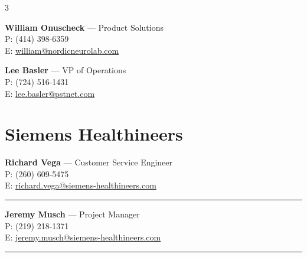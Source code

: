 \documentclass[10pt,a4paper,landscape]{article}
\begin{document}
\begin{multicols}{3}
\begin{tcolorbox}[title={\small\bfseries\color{ndblue} NORDIC NEUROLAB}, colbacktitle=cardbg, coltitle=ndblue, detach title, before upper={\tcbtitle\vspace{4pt}\hrule\vspace{6pt}}]
    \textbf{William Onuscheck} \small{--- Product Solutions} \\
    \small{P: (414) 398-6359} \\
    \small{E: \href{mailto:william@nordicneurolab.com}{william@nordicneurolab.com}}
\end{tcolorbox}

\begin{tcolorbox}[title={\small\bfseries\color{ndblue} ENCORE MRI SIMULATOR}, colbacktitle=cardbg, coltitle=ndblue, detach title, before upper={\tcbtitle\vspace{4pt}\hrule\vspace{6pt}}]
    \textbf{Lee Basler} \small{--- VP of Operations} \\
    \small{P: (724) 516-1431} \\
    \small{E: \href{mailto:lee.basler@pstnet.com}{lee.basler@pstnet.com}}
\end{tcolorbox}



\section*{Siemens Healthineers}

\begin{tcolorbox}
    \textbf{Richard Vega} \small{--- Customer Service Engineer} \\
    \small{P: (260) 609-5475} \\
    \small{E: \href{mailto:richard.vega@siemens-healthineers.com}{richard.vega@siemens-healthineers.com}}

    \vspace{4pt}\hrule\vspace{4pt}

    \textbf{Jeremy Musch} \small{--- Project Manager} \\
    \small{P: (219) 218-1371} \\
    \small{E: \href{mailto:jeremy.musch@siemens-healthineers.com}{jeremy.musch@siemens-healthineers.com}}

    \vspace{4pt}\hrule\vspace{4pt}


\end{tcolorbox}
\end{multicols}
\end{document}
